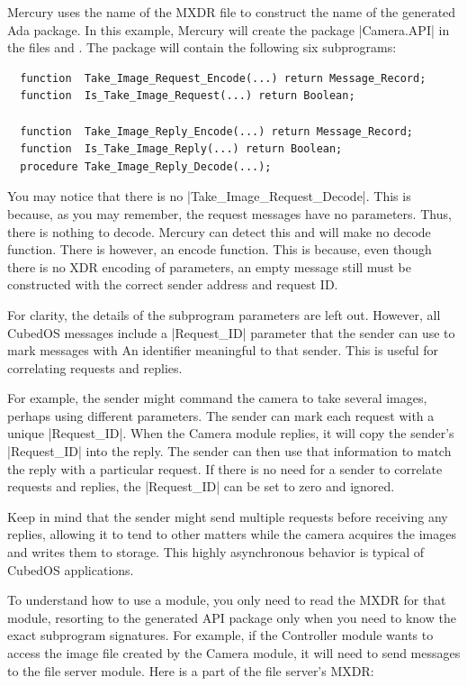 Mercury uses the name of the MXDR file to construct the name of the generated Ada package. In
this example, Mercury will create the package |Camera.API| in the files
 and . The package will contain the following
six subprograms:

\begin{verbatim}
  function  Take_Image_Request_Encode(...) return Message_Record;
  function  Is_Take_Image_Request(...) return Boolean;

  function  Take_Image_Reply_Encode(...) return Message_Record;
  function  Is_Take_Image_Reply(...) return Boolean;
  procedure Take_Image_Reply_Decode(...);
\end{verbatim}

You may notice that there is no |Take_Image_Request_Decode|. This is because, as you may
remember, the request messages have no parameters. Thus, there is nothing to decode. Mercury
can detect this and will make no decode function. There is however, an encode function. This
is because, even though there is no XDR encoding of parameters, an empty message still must be
constructed with the correct sender address and request ID.

For clarity, the details of the subprogram parameters are left out. However, all CubedOS
messages include a |Request_ID| parameter that the sender can use to mark messages with An
identifier meaningful to that sender. This is useful for correlating requests and replies.

For example, the sender might command the camera to take several images, perhaps using different
parameters. The sender can mark each request with a unique |Request_ID|. When the Camera module
replies, it will copy the sender's |Request_ID| into the reply. The sender can then use that
information to match the reply with a particular request. If there is no need for a sender to
correlate requests and replies, the |Request_ID| can be set to zero and ignored.

Keep in mind that the sender might send multiple requests before receiving any replies, allowing
it to tend to other matters while the camera acquires the images and writes them to storage.
This highly asynchronous behavior is typical of CubedOS applications.

To understand how to use a module, you only need to read the MXDR for that module, resorting to
the generated API package only when you need to know the exact subprogram signatures. For
example, if the Controller module wants to access the image file created by the Camera module,
it will need to send messages to the file server module. Here is a part of the file server's
MXDR:


